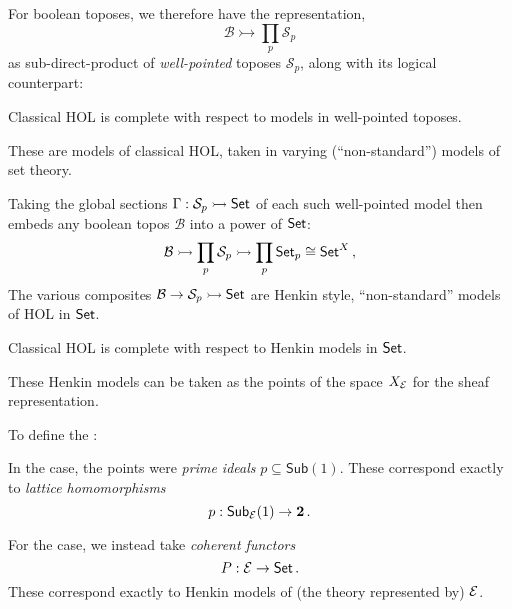\documentclass[lambek.tex]{subfiles}
\begin{document}
For boolean toposes, we therefore have the  representation, 
\[
\mathcal{B} \rightarrowtail \prod_{p}\mathcal{S}_p 
\]
as sub-direct-product of \emph{well-pointed} toposes $\mathcal{S}_p$, along with its logical counterpart:
%
\begin{corollary}
Classical HOL is complete with respect to models in well-pointed toposes.
\end{corollary}
\medskip

These are  models of classical HOL, taken in varying (``non-standard'') models of set theory.



Taking the global sections $\Gamma:\mathcal{S}_p \rightarrowtail \mathsf{Set}$ of each such well-pointed model then embeds any boolean topos $\mathcal{B}$ into a power of $\mathsf{Set}$:
\[
\mathcal{B} \rightarrowtail \prod_{p}\mathcal{S}_p \rightarrowtail \prod_{p}\mathsf{Set}_p \cong \mathsf{Set}^X\,,
\]
The various composites $\mathcal{B} \rightarrow \mathcal{S}_p \rightarrowtail \mathsf{Set}$ are Henkin style, ``non-standard'' models of HOL in $\mathsf{Set}$.

\begin{corollary}
Classical HOL is complete with respect to Henkin models in $\mathsf{Set}$.
\end{corollary}
\medskip

These Henkin models can be taken as the points of the space $X_{\mathcal{E}}$ for the sheaf representation.

To define the :
\medskip

In the  case, the points were \emph{prime ideals} $p\subseteq\mathsf{Sub}(1)$.
These correspond exactly to \emph{lattice homomorphisms} $$p: \mathsf{Sub}_{\mathcal{E}}(1)\to \mathbf{2}\,.$$

For the  case, we instead take \emph{coherent functors} $$P: \mathcal{E}\to\mathsf{Set}\,.$$
These correspond exactly to Henkin models of (the theory represented by) $\mathcal{E}$.
\medskip
\end{document}
